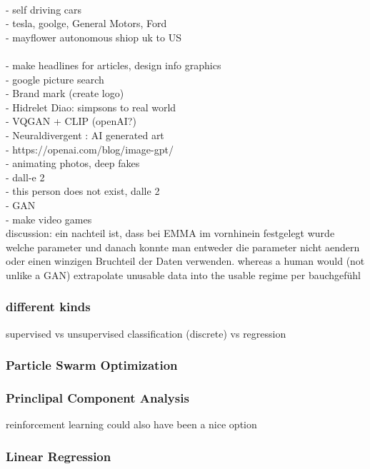 \\
 - self driving cars\\
 - tesla, goolge, General Motors, Ford\\
 - mayflower autonomous shiop uk to US\\

\\
 - make headlines for articles, design info graphics\\
 - google picture search\\
 - Brand mark (create logo)\\
 - Hidrelet Diao: simpsons to real world \\
 - VQGAN + CLIP (openAI?)\\
 - Neuraldivergent : AI generated art\\
 - https://openai.com/blog/image-gpt/\\
 - animating photos, deep fakes\\
 - dall-e 2 \cite{Marcus2022}\\
 - this person does not exist, dalle 2 \\
 - GAN\\
 - make video games \cite{Guzdial2016}\\

 discussion: ein nachteil ist, dass bei EMMA im vornhinein festgelegt wurde welche parameter und danach konnte man entweder die parameter nicht aendern oder einen winzigen Bruchteil der Daten verwenden. whereas a human would (not unlike a GAN) extrapolate unusable data into the usable regime per bauchgefühl


\subsubsection{different kinds} 
supervised vs unsupervised
classification (discrete) vs regression
%
\subsubsection{Particle Swarm Optimization}
%
\subsubsection{Princlipal Component Analysis}
reinforcement learning could also have been a nice option
%
\subsubsection{Linear Regression}
%
